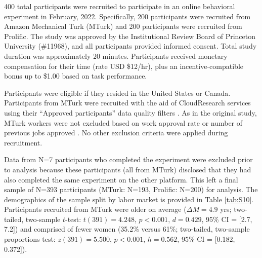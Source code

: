 \documentclass[a4paper,notitlepage,12pt]{article}
\begin{document}
400 total participants were recruited to participate in an online behavioral experiment in February, 2022. Specifically, 200 participants were recruited from Amazon Mechanical Turk (MTurk) and 200 participants were recruited from Prolific. The study was approved by the Institutional Review Board of Princeton University (\#11968), and all participants provided informed consent. Total study duration was approximately 20 minutes. Participants received monetary compensation for their time (rate USD \$12/hr), plus an incentive-compatible bonus up to \$1.00 based on task performance. 

Participants were eligible if they resided in the United States or Canada. Participants from MTurk were recruited with the aid of CloudResearch services \cite{litman2017turkprime-2} using their ``Approved participants''  data quality filters \cite{cloudresearch_2020-2}. As in the original study, MTurk workers were not excluded based on work approval rate or number of previous jobs approved \cite{robinson2019tapped-2}. No other exclusion criteria were applied during recruitment.

Data from N=7 participants who completed the experiment were excluded prior to analysis because these participants (all from MTurk) disclosed that they had also completed the same experiment on the other platform. This left a final sample of N=393 participants (MTurk: N=193, Prolific: N=200) for analysis. The demographics of the sample split by labor market is provided in Table \ref{tab:S10}. Participants recruited from MTurk were older on average ($\Delta M = 4.9$ yrs; two-tailed, two-sample $t$-test: $t(391)=4.248$, $p<0.001$, $d = 0.429$, 95\% CI = [2.7, 7.2]) and comprised of fewer women (35.2\% versus 61\%; two-tailed, two-sample proportions test: $z(391)=5.500$, $p<0.001$, $h=0.562$, 95\% CI = [0.182, 0.372]). 
\end{document}
